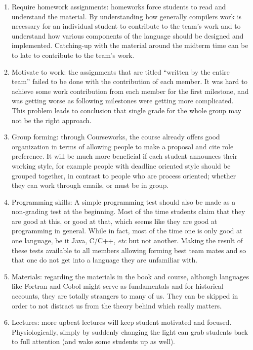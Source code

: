 \begin{enumerate}

\item Require homework assignments: homeworks force students to read and 
understand the material. By understanding how generally compilers work is
necessary for an individual student to contribute to the team's work and
to understand how various components of the language should be designed and
implemented. Catching-up with the material around the midterm time can be
to late to contribute to the team's work. 

\item Motivate to work: the assignments that are titled ``written by the
entire team'' failed to be done with the contribution of each member. It
was hard to achieve some work contribution from each member for the first
milestone, and was getting worse as following milestones were getting more 
complicated. This problem leads to conclusion that single grade for the
whole group may not be the right approach.

\item Group forming: through Courseworks, the course already offers good
organization in terms of allowing people to make a proposal and cite role
preference. It will be much more beneficial if each student announces their
working style, for example people with deadline oriented style should be
grouped together, in contrast to people who are process oriented; whether
they can work through emails, or must be in group.

\item Programming skills: A simple programming test should also be made as 
a non-grading test at the beginning. Most of the time students claim that
they are good at this, or good at that, which seems like they are good at
programming in general. While in fact, most of the time one is only good
at one language, be it Java, C/C++, \textit{etc} but not another. Making
the result of these tests available to all members allowing forming best
team mates and so that one do not get into a language they are unfamiliar
with.

\item Materials: regarding the materials in the book and course, although
languages like Fortran and Cobol might serve as fundamentals and for
historical accounts, they are totally strangers to many of us. They can be 
skipped in order to not distract us from the theory behind which really
matters.

\item Lectures: more upbeat lectures will keep student motivated and
focused. Physiologically, simply by suddenly changing the light can grab
students back to full attention (and wake some students up as well).

\end{enumerate}

